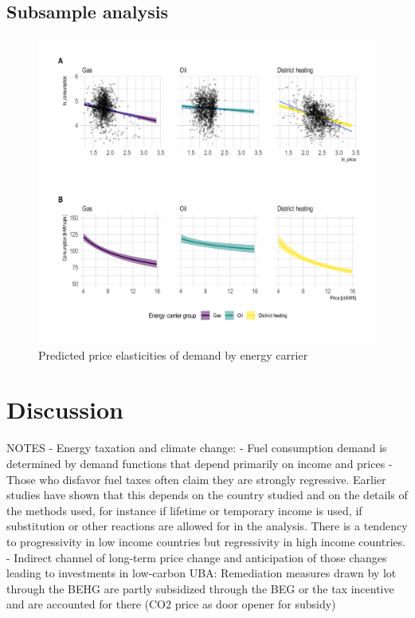\documentclass[12pt,twoside]{reedthesis}
\begin{document}
\hypertarget{full_results}{%
\section{Subsample analysis}\label{full_results}}
\begin{figure}

{\centering \includegraphics[width=1\linewidth]{figure/elasticity_predictions_subsample} 

}

\caption{Predicted price elasticities of demand by energy carrier}\label{fig:elasticity-predictions-subsample-graph}
\end{figure}
\hypertarget{discussion}{%
\chapter{Discussion}\label{discussion}}

NOTES - Energy taxation and climate change:
- Fuel consumption demand is determined by demand functions that depend primarily on income and prices
- Those who disfavor fuel taxes often claim they are strongly regressive. Earlier studies have shown that this depends on the country studied and on the details of the methods used, for instance if lifetime or temporary income is used, if substitution or other reactions are allowed for in the analysis. There is a tendency to progressivity in low income countries but regressivity in high income countries.
- Indirect channel of long-term price change and anticipation of those changes leading to investments in low-carbon UBA: Remediation measures drawn by lot through the BEHG are partly subsidized through the BEG or the tax incentive and are accounted for there (CO2 price as door opener for subsidy)
\end{document}
